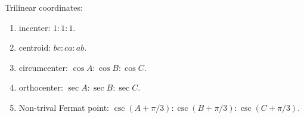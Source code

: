 Trilinear coordinates:
\begin{enumerate}
	\item incenter: $1:1:1$.
	\item centroid: $bc:ca:ab$.
	\item circumcenter: $\cos A:\cos B:\cos C$.
	\item orthocenter: $\sec A:\sec B:\sec C$.
	\item Non-trival Fermat point: $\csc(A+\pi/3):\csc(B+\pi/3):\csc(C+\pi/3)$.
\end{enumerate}


